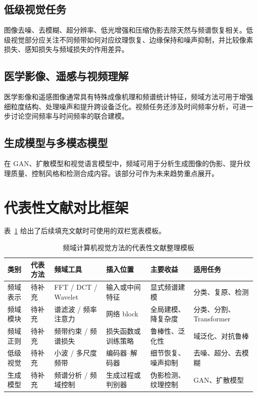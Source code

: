 \documentclass[journal,10pt]{IEEEtran}
\begin{document}
\subsection{低级视觉任务}
图像去噪、去模糊、超分辨率、低光增强和压缩伪影去除天然与频谱恢复相关。低级视觉部分应关注不同频带如何对应纹理恢复、边缘保持和噪声抑制，并比较像素损失、感知损失与频域损失的作用差异。

\subsection{医学影像、遥感与视频理解}
医学影像和遥感图像通常具有特殊成像机理和频谱统计特征，频域方法可用于增强细粒度结构、处理噪声和提升跨设备泛化。视频任务还涉及时间频率分析，可进一步讨论空间频率与时间频率的联合建模。

\subsection{生成模型与多模态模型}
在 GAN、扩散模型和视觉语言模型中，频域可用于分析生成图像的伪影、提升纹理质量、控制风格和检测合成内容。该部分可作为未来趋势重点展开。

\section{代表性文献对比框架}
表~\ref{tab:taxonomy} 给出了后续填充文献时可使用的双栏宽表模板。

\begin{table}[t]
\centering
\caption{频域计算机视觉方法的代表性文献整理模板}
\label{tab:taxonomy}
\vspace{0.5em}
\begin{tabular}{@{}p{2.0cm}p{2.8cm}p{2.3cm}p{2.7cm}p{2.7cm}p{2.5cm}@{}}
\toprule
\textbf{类别} & \textbf{代表方法} & \textbf{频域工具} & \textbf{插入位置} & \textbf{主要收益} & \textbf{适用任务} \\ \midrule
频域表示 & 待补充 & FFT / DCT / Wavelet & 输入或中间特征 & 显式频谱建模 & 分类、复原、检测 \\
频域模块 & 待补充 & 谱滤波 / 频率注意力 & 网络 block & 全局建模、降复杂度 & 分类、分割、Transformer \\
频域正则 & 待补充 & 频带约束 / 频谱损失 & 损失函数或训练策略 & 鲁棒性、泛化性 & 域泛化、对抗鲁棒 \\
低级视觉 & 待补充 & 小波 / 多尺度频带 & 编码器--解码器 & 细节恢复、噪声抑制 & 去噪、超分、去模糊 \\
生成模型 & 待补充 & 频谱分析 / 频域控制 & 生成过程或判别器 & 伪影检测、纹理控制 & GAN、扩散模型 \\ \bottomrule
\end{tabular}
\end{table}
\end{document}
